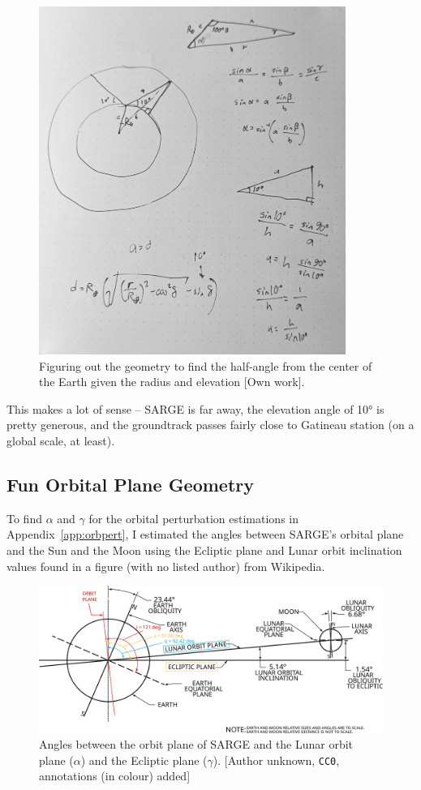 \documentclass[9pt]{article}
\begin{document}
\begin{figure}[h]
  \centering
  \captionsetup{width=.75\linewidth,font=small,labelfont=bf}
  \includegraphics[width=10cm]{annulus}
  \caption{Figuring out the geometry to find the half-angle from the center of the Earth given the radius and elevation [Own work].}
  \label{fig:annulus}
\end{figure}

This makes a lot of sense -- SARGE is far away, the elevation angle of \ang{10} is pretty generous, and the groundtrack passes fairly close to Gatineau station (on a global scale, at least).

\subsection{Fun Orbital Plane Geometry}\label{app:orbplanes}

To find $\alpha$ and $\gamma$ for the orbital perturbation estimations in Appendix~\ref{app:orbpert}, I estimated the angles between SARGE's orbital plane and the Sun and the Moon using the Ecliptic plane and Lunar orbit inclination values found in a figure (with no listed author) from Wikipedia.

\begin{figure}[hb]
  \centering
  \includegraphics[width=15cm]{Annotated_Moon_Orbit}
  \caption{Angles between the orbit plane of SARGE and the Lunar orbit plane ($\alpha$) and the Ecliptic plane ($\gamma$). [Author unknown, \texttt{CC0}, annotations (in colour) added]}
  \label{fig:moonorbit}
\end{figure}
\end{document}
